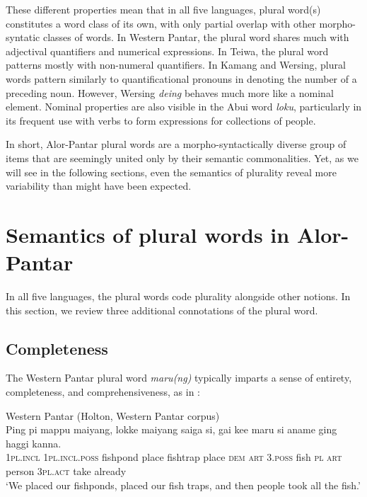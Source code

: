  These different properties mean that in all five languages, plural word(s) constitutes a word class of its own, with only partial overlap with other morpho-syntatic classes of words. In Western Pantar, the plural word shares much with adjectival quantifiers and numerical expressions. In Teiwa, the plural word patterns mostly with non-numeral quantifiers. In Kamang and Wersing, plural words pattern similarly to quantificational pronouns in denoting the number of a preceding noun. However, Wersing \textit{deing} behaves much more like a nominal element. Nominal properties are also visible in the Abui word \textit{loku}, particularly in its frequent use with verbs to form expressions for collections of people.

 In short, Alor-Pantar plural words are a morpho-syntactically diverse group of items that are seemingly united only by their semantic commonalities. Yet, as we will see in the following sections, even the semantics of plurality reveal more variability than might have been expected.

\section{Semantics of plural words in Alor-Pantar}  %
\label{sec:9:4}
In all five languages, the plural words code plurality alongside other notions. In this section, we review three additional connotations of the plural word.

\subsection{Completeness} %
\label{sec:9:4.1}
The Western Pantar plural word \textit{maru(ng)} typically imparts a sense of entirety, completeness, and comprehensiveness, as in :


\ea%
\label{ex:9:65}
Western Pantar (Holton, Western Pantar corpus)\\
\gll  Ping pi mappu maiyang, lokke maiyang saiga si, gai ke{{\textglotstop}}{e} maru si aname ging haggi kanna. \\
    \textsc{1pl.incl}  \textsc{1pl.incl.poss} fishpond place fishtrap place \textsc{dem} \textsc{art}  \textsc{3.poss} fish \textsc{pl} \textsc{art} person \textsc{3pl.act} take already \\
\glt `We placed our fishponds, placed our fish traps,  and then people took all the fish.'
\z


